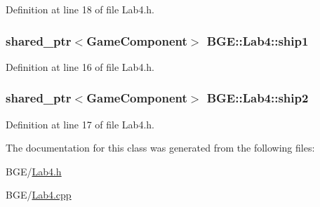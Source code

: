 Definition at line 18 of file Lab4.\-h.

\hypertarget{class_b_g_e_1_1_lab4_a43b2de60cb4fc750d55b81d3242525c5}{
\subsubsection[{ship1}]{\setlength{\rightskip}{0pt plus 5cm}shared\-\_\-ptr$<${\bf Game\-Component}$>$ B\-G\-E\-::\-Lab4\-::ship1}}\label{class_b_g_e_1_1_lab4_a43b2de60cb4fc750d55b81d3242525c5}


Definition at line 16 of file Lab4.\-h.

\hypertarget{class_b_g_e_1_1_lab4_a56dbfca59b226a122e136e9266a74bba}{
\subsubsection[{ship2}]{\setlength{\rightskip}{0pt plus 5cm}shared\-\_\-ptr$<${\bf Game\-Component}$>$ B\-G\-E\-::\-Lab4\-::ship2}}\label{class_b_g_e_1_1_lab4_a56dbfca59b226a122e136e9266a74bba}


Definition at line 17 of file Lab4.\-h.



The documentation for this class was generated from the following files\-:\begin{DoxyCompactItemize}
\item 
B\-G\-E/\hyperlink{_lab4_8h}{Lab4.\-h}\item 
B\-G\-E/\hyperlink{_lab4_8cpp}{Lab4.\-cpp}\end{DoxyCompactItemize}
